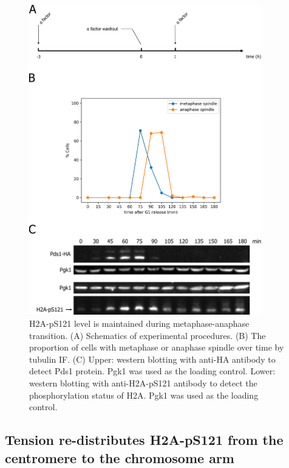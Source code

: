 \begin{figure}[htbp]
  \centering
  \includegraphics[width=0.9\textwidth]{chapter3/figures/pH2A mitotic time course.pdf}
  \caption[H2A-pS121 level is maintained during metaphase-anaphase transition]{H2A-pS121 level is maintained during metaphase-anaphase transition. (A) Schematics of experimental procedures. (B) The proportion of cells with metaphase or anaphase spindle over time by tubulin IF. (C) Upper: western blotting with anti-HA antibody to detect Pds1 protein. Pgk1 was used as the loading control. Lower: western blotting with anti-H2A-pS121 antibody to detect the phosphorylation status of H2A. Pgk1 was used as the loading control.}
  \label{fig:ph2atimecourse}
\end{figure}

\subsection{Tension re-distributes H2A-pS121 from the centromere to the chromosome arm}

